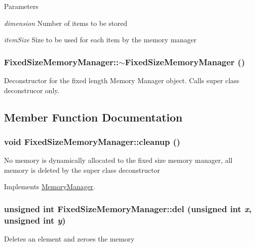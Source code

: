 \begin{DoxyParams}{Parameters}
\item[{\em dimension}]Number of items to be stored \item[{\em itemSize}]Size to be used for each item by the memory manager \end{DoxyParams}
\hypertarget{classFixedSizeMemoryManager_af7977c53d24fc453ec41a1cd9663d922}{
\subsubsection[{$\sim$FixedSizeMemoryManager}]{\setlength{\rightskip}{0pt plus 5cm}FixedSizeMemoryManager::$\sim$FixedSizeMemoryManager ()}}
\label{classFixedSizeMemoryManager_af7977c53d24fc453ec41a1cd9663d922}
Deconstructor for the fixed length Memory Manager object. Calls super class deconstrucor only. 

\subsection{Member Function Documentation}
\hypertarget{classFixedSizeMemoryManager_a1661dd249c37ba16c409c9155985429c}{
\subsubsection[{cleanup}]{\setlength{\rightskip}{0pt plus 5cm}void FixedSizeMemoryManager::cleanup ()}}
\label{classFixedSizeMemoryManager_a1661dd249c37ba16c409c9155985429c}
No memory is dynamically allocated to the fixed size memory manager, all memory is deleted by the super class deconstructor 

Implements \hyperlink{classMemoryManager_ab24d56675e49909dfa6ccc67163d9add}{MemoryManager}.

\hypertarget{classFixedSizeMemoryManager_afad762c113d7a31766d3bff489ede569}{
\subsubsection[{del}]{\setlength{\rightskip}{0pt plus 5cm}unsigned int FixedSizeMemoryManager::del (unsigned int {\em x}, \/  unsigned int {\em y})}}
\label{classFixedSizeMemoryManager_afad762c113d7a31766d3bff489ede569}
Deletes an element and zeroes the memory


